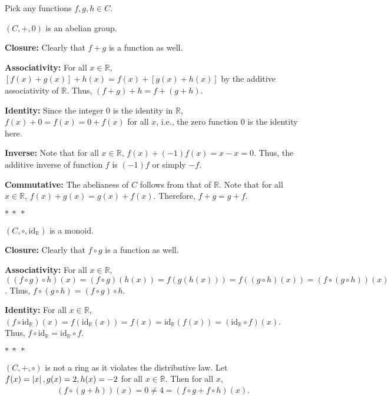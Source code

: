 \documentclass[12pt]{article}
\begin{document}
\begin{fproof}[Jacobson 2.1.1]
  Pick any functions \(f,g,h \in C\).

  \((C, +, 0)\) is an abelian group. 

  \textbf{Closure:}
  Clearly that \(f+g\) is a function as well.

  \textbf{Associativity:}
  For all \(x \in \mathbb{R}\),
  \([f(x) + g(x)] + h(x) = f(x) + [g(x) + h(x)]\) by the additive associativity of \(\mathbb{R}\). Thus, \((f + g) + h = f + (g + h)\).

  \textbf{Identity:}
  Since the integer 0 is the identity in \(\mathbb{R}\), \(f(x) + 0 = f(x) = 0 + f(x)\) for all \(x\), i.e., the zero function 0 is the identity here.

  \textbf{Inverse:}
  Note that for all \(x \in \mathbb{R}\), \(f(x) + (-1)f(x) = x - x = 0\). Thus, the additive inverse of function \(f\) is \((-1)f\) or simply \(-f\).

  \textbf{Commutative:}
  The abelianess of \(C\) follows from that of \(\mathbb{R}\). Note that for all \(x \in \mathbb{R}\), \(f(x) + g(x) = g(x) + f(x)\). Therefore, \(f + g = g + f\).

  \begin{center}
    \(\ast~\ast~\ast\)
  \end{center}

  \((C, \circ, \text{id}_{\mathbb{R}})\) is a monoid.

  \textbf{Closure:}
  Clearly that \(f \circ g\) is a function as well.

  \textbf{Associativity:}
  For all \(x \in \mathbb{R}\),
  \(((f \circ g) \circ h) (x)= (f \circ g)(h(x)) = f(g(h(x))) = f((g \circ h) (x)) = (f \circ (g \circ h)) (x)\).
  Thus, \(f \circ (g \circ h) = (f \circ g) \circ h\).

  \textbf{Identity:}
  For all \(x \in \mathbb{R}\), \((f \circ \text{id}_{\mathbb{R}}) (x) = f(\text{id}_{\mathbb{R}}(x)) = f(x) = \text{id}_{\mathbb{R}}(f(x)) = (\text{id}_{\mathbb{R}} \circ f)(x)\). Thus, \(f \circ \text{id}_{\mathbb{R}} = \text{id}_{\mathbb{R}} \circ f\).

  \begin{center}
    \(\ast~\ast~\ast\)
  \end{center}

  \((C, +, \circ)\) is not a ring as it violates the distributive law.
  Let \(f(x) = \left\lvert x \right\rvert, g(x) = 2, h(x) = -2\) for all \(x \in \mathbb{R}\).
  Then for all \(x\),
  \begin{align*}
    (f \circ (g + h))(x) = 0 \neq 4 = (f \circ g + f \circ h)(x).
  \end{align*}
\end{fproof}
\newpage
\end{document}
